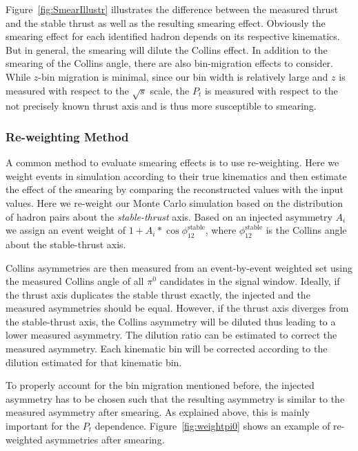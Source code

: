  Figure~\ref{fig:SmearIllustr} illustrates the difference between the measured thrust and the stable thrust as well as the resulting smearing effect. Obviously the smearing effect for each identified hadron depends on its respective kinematics. But in general, the smearing will dilute the Collins effect. In addition to the smearing of the Collins angle, there are also bin-migration effects to consider. While $z$-bin migration is minimal, since our bin width is relatively large and $z$ is measured with respect to the $\sqrt{s}$ scale, the $P_t$ is measured with respect to the not precisely known thrust axis and is thus more susceptible to smearing.


\subsubsection{\texorpdfstring{Re-weighting Method}{Re-weighting Method}} 
\label{sec:pi0thrustcorrection}
A common method to evaluate smearing effects is to use re-weighting. Here we weight events in simulation according to their true kinematics and then estimate the effect of the smearing by comparing the reconstructed values with the input values.
 Here we re-weight our Monte Carlo simulation based on the distribution of hadron pairs about the {\em stable-thrust} axis. Based on an injected asymmetry $A_i$ we assign an event weight of $1+A_i*\cos\phi_{12}^{\text{stable}}$, where $\phi_{12}^\text{stable}$ is the Collins angle about the stable-thrust axis.

Collins asymmetries are then measured from an event-by-event weighted set using the measured Collins angle of all $\pi^0$ candidates in the signal window. 
Ideally, if the thrust axis duplicates the stable thrust exactly, the injected and the measured asymmetries should be equal. 
However, if the thrust axis diverges from the stable-thrust axis, the Collins asymmetry will be diluted thus leading to a lower measured asymmetry. 
The dilution ratio can be estimated to correct the measured asymmetry. Each kinematic bin will be corrected according to  the dilution estimated for that kinematic bin.

To properly account for the bin migration mentioned before, the injected asymmetry has to be chosen such that the resulting asymmetry is similar to the measured asymmetry after smearing. 
As explained above, this is mainly important for the $P_t$ dependence. 
Figure~\ref{fig:weightpi0} shows an example of re-weighted asymmetries after smearing.

